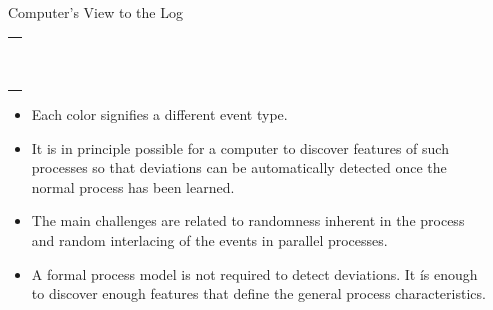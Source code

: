 \documentclass[final,xcolor={usenames,x11names}]{beamer}
\newlength{\sepwid}
\newlength{\onecolwid}
\begin{document}
\begin{frame}[t]
\begin{columns}[t]
\begin{column}{\onecolwid}
\begin{alertblock}{Computer's View to the Log}
\begin{center}
{\begin{tabular}{|c|}
  \\
  \hline
  \cellcolor{PaleTurquoise2>wheel,2,11}\hspace{3cm}
  \\
  \hline
  \cellcolor{PaleTurquoise2>wheel,5,11}\hspace{3cm}
  \\
  \hline
  \cellcolor{PaleTurquoise2>wheel,6,11}\hspace{3cm}
  \\
  \hline
  \cellcolor{PaleTurquoise2>wheel,2,11}\hspace{3cm}
  \\
  \hline
  \cellcolor{PaleTurquoise2>wheel,7,11}\hspace{3cm}
  \\
  \hline
  \cellcolor{PaleTurquoise2>wheel,8,11}\hspace{3cm}
  \\
  \hline
  \cellcolor{PaleTurquoise2>wheel,2,11}\hspace{3cm}
  \\
  \hline
  \cellcolor{PaleTurquoise2>wheel,2,11}\hspace{3cm}
  \\
  \hline
  \cellcolor{PaleTurquoise2>wheel,10,11}\hspace{3cm}
  \\
  \hline
  \cellcolor{PaleTurquoise2>wheel,9,11}\hspace{3cm}
  \\
  \hline
  \cellcolor{PaleTurquoise2>wheel,10,11}\hspace{3cm}
  \\
  \hline
\end{tabular}
}
\end{center}

\begin{itemize}
\item Each color signifies a different event type.
\item It is in principle possible for a computer to discover features of such processes so that deviations can be automatically detected once the normal process has been learned.
\item The main challenges are related to randomness inherent in the process and random interlacing of the events in parallel processes.
\item A formal process model is not required to detect deviations. It ís enough to discover enough features that define the general process characteristics.
\end{itemize}

\end{alertblock}


\end{column}

\begin{column}{\sepwid}\end{column} %

\end{columns}

\end{frame}
\end{document}
